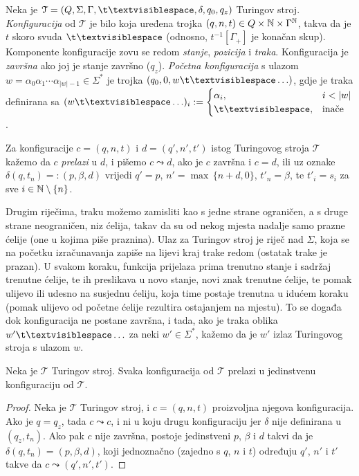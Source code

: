 \begin{definicija}
Neka je $\mathcal T=(Q,\Sigma,\Gamma,\bl,\delta,q_0,q_z)$ Turingov stroj. \emph{Konfiguracija} od $\mathcal T$ je bilo koja uređena trojka $(q,n,t)\in Q\times{\mathbb N}\times\Gamma^{\mathbb N}$, takva da je $t$ skoro svuda $\bl$ (odnosno, $t^{-1}[\Gamma_+]$ je konačan skup). Komponente konfiguracije zovu se redom \emph{stanje}, \emph{pozicija} i \emph{traka}. Konfiguracija je \emph{završna} ako joj je stanje završno ($q_z$). \emph{Početna konfiguracija} s ulazom $w=\alpha_0\alpha_1\dotsm\alpha_{\left|w\right|-1}\in\Sigma^*$ je trojka $(q_0,0,w\bl\ldots)$, gdje je traka definirana sa $(w\bl\ldots)_i:=\begin{cases}
\alpha_i,&i<\left|w\right|\\
\bl,&\text{inače}
\end{cases}$.

Za konfiguracije $c=(q,n,t)$ i $d=(q',n',t')$ istog Turingovog stroja $\mathcal T$ kažemo da $c$ \emph{prelazi} u $d$, i pišemo $c\leadsto d$, ako je $c$ završna i $c=d$, ili uz oznake $\delta(q,t_n)=:(p,\beta,d)$ vrijedi $q'=p$, $n'=\max\,\{n+d,0\}$, $t'_n=\beta$, te $t'_i=s_i$ za sve $i\in{\mathbb N}\setminus\{n\}$.
\end{definicija}

Drugim riječima, traku možemo zamisliti kao s jedne strane ograničen, a s druge strane neograničen, niz ćelija, takav da su od nekog mjesta nadalje samo prazne ćelije (one u kojima piše praznina). Ulaz za Turingov stroj je riječ nad $\Sigma$, koja se na početku izračunavanja zapiše na lijevi kraj trake redom (ostatak trake je prazan). U svakom koraku, funkcija prijelaza prima trenutno stanje i sadržaj trenutne ćelije, te ih preslikava u novo stanje, novi znak trenutne ćelije, te pomak ulijevo ili udesno na susjednu ćeliju, koja time postaje trenutna u idućem koraku (pomak ulijevo od početne ćelije rezultira ostajanjem na mjestu). To se događa dok konfiguracija ne postane završna, i tada, ako je traka oblika $w'\bl\ldots$ za neki $w'\in\Sigma^*$, kažemo da je $w'$ izlaz Turingovog stroja s ulazom $w$.

\begin{lema}\label{lm:Turingdet}
Neka je $\mathcal T$ Turingov stroj. Svaka konfiguracija od $\mathcal T$ prelazi u jedinstvenu konfiguraciju od $\mathcal T$.
\end{lema}
\begin{proof}
Neka je $\mathcal T$ Turingov stroj, i $c=(q,n,t)$ proizvoljna njegova konfiguracija. Ako je $q=q_z$, tada $c\leadsto c$, i ni u koju drugu konfiguraciju jer $\delta$ nije definirana u $(q_z,t_n)$. Ako pak $c$ nije završna, postoje jedinstveni $p$, $\beta$ i $d$ takvi da je $\delta(q,t_n)=(p,\beta,d)$, koji jednoznačno (zajedno s $q$, $n$ i $t$) određuju $q'$, $n'$ i $t'$ takve da $c\leadsto(q',n',t')$.
\end{proof}

